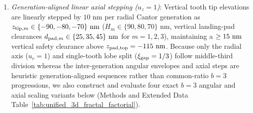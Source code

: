 \documentclass[pdflatex,sn-nature]{sn-jnl}
\begin{document}
\begin{enumerate}
    \item \emph{Generation-aligned linear axial stepping ($u_z = 1$)}: Vertical tooth tip elevations are linearly stepped by $10\text{ nm}$ per radial Cantor generation as $z_{{\rm tip},m} \in \{-90, -80, -70\}\text{ nm}$ ($H_m \in \{90, 80, 70\}\text{ nm}$, vertical landing-pad clearances $d_{{\rm pad},m} \in \{25, 35, 45\}\text{ nm}$ for $m=1,2,3$), maintaining a $\ge 15{}\text{ nm}$ vertical safety clearance above $z_{\rm pad,top} = -115\text{ nm}$. Because only the radial axis ($u_r=1$) and single-tooth lobe split ($\xi_{\rm gap}=1/3$) follow middle-third division whereas the inter-generation angular envelopes and axial steps are heuristic generation-aligned sequences rather than common-ratio $b=3$ progressions, we also construct and evaluate four exact $b=3$ angular and axial scaling variants below (Methods and Extended Data Table~\ref{tab:unified_3d_fractal_factorial}).
\end{enumerate}
\end{document}
